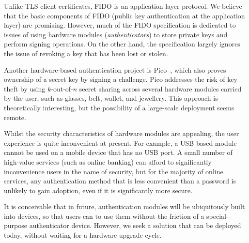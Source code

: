 Unlike TLS client certificates, FIDO is an application-layer protocol. We believe that the basic
components of FIDO (public key authentication at the application layer) are promising. However, much
of the FIDO specification is dedicated to issues of using hardware modules (\emph{authenticators})
to store private keys and perform signing operations. On the other hand, the specification largely
ignores the issue of revoking a key that has been lost or stolen.

Another hardware-based authentication project is Pico~\cite{Stajano11}, which also proves ownership
of a secret key by signing a challenge. Pico addresses the risk of key theft by using $k$-out-of-$n$
secret sharing across several hardware modules carried by the user, such as glasses, belt, wallet,
and jewellery. This approach is theoretically interesting, but the possibility of a large-scale
deployment seems remote.

Whilst the security characteristics of hardware modules are appealing, the user experience is quite
inconvenient at present. For example, a USB-based module cannot be used on a mobile device that has
no USB port. A small number of high-value services (such as online banking) can afford to
significantly inconvenience users in the name of security, but for the majority of online services,
any authentication method that is less convenient than a password is unlikely to gain adoption, even
if it is significantly more secure.

It is conceivable that in future, authentication modules will be ubiquitously built into devices, so
that users can to use them without the friction of a special-purpose authenticator device. However,
we seek a solution that can be deployed today, without waiting for a hardware upgrade cycle.

